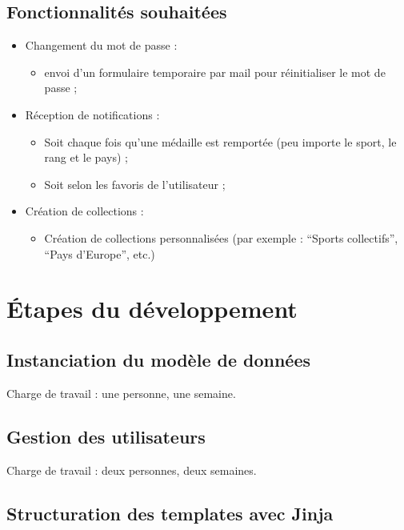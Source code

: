 \documentclass[12pt]{article}
\begin{document}
	\subsection{Fonctionnalités souhaitées}
	
	\begin{itemize}
		\item Changement du mot de passe :
		\begin{itemize}
			\item envoi d'un formulaire temporaire par mail pour réinitialiser le mot de passe ;
		\end{itemize}
		\item Réception de notifications :
		\begin{itemize}
			\item Soit chaque fois qu'une médaille est remportée (peu importe le sport, le rang et le pays) ;
			\item Soit selon les favoris de l'utilisateur ;
		\end{itemize}
		\item Création de collections :
		\begin{itemize}
			\item Création de collections personnalisées (par exemple : \enquote{Sports collectifs}, \enquote{Pays d'Europe}, etc.)
		\end{itemize}
	\end{itemize}
	
	\section{Étapes du développement}
	
	\subsection*{Instanciation du modèle de données}
	
	Charge de travail : une personne, une semaine.
	
	\subsection*{Gestion des utilisateurs}
	
	Charge de travail : deux personnes, deux semaines.
	
	\subsection*{Structuration des templates avec Jinja}
	
\end{document}
